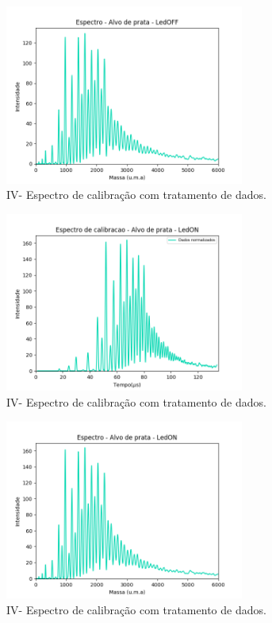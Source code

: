 \begin{figure}
  \centering  
  \includegraphics[width=0.7\textwidth]{exp_04/LEDOFF_espec_calib_ag_massa.png}
  \caption{IV- Espectro de calibração com tratamento de dados.}
  \label{fig:04_ledoff_massa} 
\end{figure}



\begin{figure}
  \centering  
  \includegraphics[width=0.7\textwidth]{exp_04/LEDON_normalizado_mcp.png}
  \caption{IV- Espectro de calibração com tratamento de dados.}
  \label{fig:04_ledon_dados_tratados} 
\end{figure}

\begin{figure}
  \centering  
  \includegraphics[width=0.7\textwidth]{exp_04/LEDON_espec_calib_ag_massa.png}
  \caption{IV- Espectro de calibração com tratamento de dados.}
  \label{fig:04_ledon_massa} 
\end{figure}

